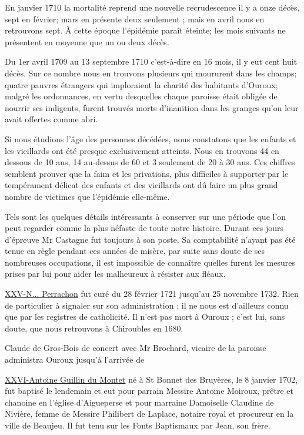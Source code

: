 En janvier 1710 la mortalité reprend une nouvelle recrudescence il y a onze décès, sept en février; mars en présente deux seulement ; mais en avril nous en retrouvons sept. À cette époque l'épidémie paraît éteinte; les mois suivants ne présentent en moyenne que un ou deux décès.

Du 1er avril 1709 au 13 septembre 1710 c'est-à-dire en 16 mois, il y eut cent huit décès. Sur ce nombre nous en trouvons plusieurs qui moururent dans les champs; quatre pauvres étrangers qui imploraient la charité des habitants d'Ouroux; malgré les ordonnances, en vertu desquelles chaque paroisse était obligée de nourrir ses indigents, furent trouvés morts d'inanition dans les granges qu'on leur avait offertes comme abri.

Si nous étudions l'âge des personnes décédées, nous constatons que les enfants et les vieillards ont été presque exclusivement atteints. Nous en trouvons 44 en dessous de 10 ans, 14 au-dessus de 60 et 3 seulement de 20 à 30 ans. Ces chiffres semblent prouver que la faim et les privations, plus difficiles à supporter par le tempérament délicat des enfants et des vieillards ont dû faire un plus grand nombre de victimes que l'épidémie elle-même.

Tels sont les quelques détails intéressants à conserver sur une période que l'on peut regarder comme la plus néfaste de toute notre histoire. Durant ces jours d'épreuve Mr Castagne fut toujours à son poste. Sa comptabilité n'ayant pas été tenue en règle pendant ces années de misère, par suite sans doute de ses nombreuses occupations, il est impossible de connaître quelles furent les mesures prises par lui pour aider les malheureux à résister aux fléaux.

\underline{XXV-N... Perrachon} fut curé du 28 février 1721 jusqu'au 25 novembre 1732. Rien de particulier à signaler sur son administration ; il ne nous est d'ailleurs connu que par les registres de catholicité. Il n'est pas mort à Ouroux ; c'est lui, sans doute, que nous retrouvons à Chiroubles en 1680.

Claude de Gros-Bois de concert avec Mr Brochard, vicaire de la paroisse administra Ouroux jusqu'à l'arrivée de

\underline{XXVI-Antoine Guillin du Montet} né à St Bonnet des Bruyères, le 8 janvier 1702, fut baptisé le lendemain et eut pour parrain Messire Antoine Moiroux, prêtre et chanoine en l'église d'Aigueperse et pour marraine Damoiselle Claudine de Nivière, femme de Messire Philibert de Laplace, notaire royal et procureur en la ville de Beaujeu. Il fut tenu sur les Fonts Baptismaux par Jean, son frère.

